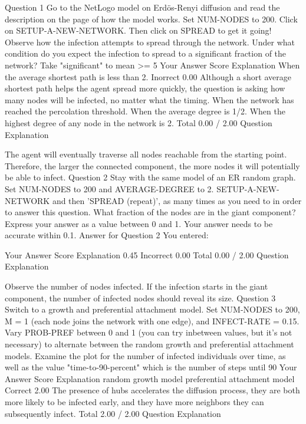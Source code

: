 Question 1
Go to the NetLogo model on Erdös-Renyi diffusion and read the description on the page of how the model works. Set NUM-NODES to 200. Click on SETUP-A-NEW-NETWORK. Then click on SPREAD to get it going! Observe how the infection attempts to spread through the network. Under what condition do you expect the infection to spread to a significant fraction of the network? Take "significant" to mean >= 5%
Your Answer		Score	Explanation
When the average shortest path is less than 2.	Inorrect	0.00	Although a short average shortest path helps the agent spread more quickly, the question is asking how many nodes will be infected, no matter what the timing.
When the network has reached the percolation threshold.			
When the average degree is 1/2.			
When the highest degree of any node in the network is 2.			
Total		0.00 / 2.00	
Question Explanation

The agent will eventually traverse all nodes reachable from the starting point. Therefore, the larger the connected component, the more nodes it will potentially be able to infect.
Question 2
Stay with the same model of an ER random graph. Set NUM-NODES to 200 and AVERAGE-DEGREE to 2. SETUP-A-NEW-NETWORK and then 'SPREAD (repeat)', as many times as you need to in order to answer this question. What fraction of the nodes are in the giant component? Express your answer as a value between 0 and 1. Your answer needs to be accurate within 0.1.
Answer for Question 2
You entered:

Your Answer		Score	Explanation
0.45	Incorrect	0.00	
Total		0.00 / 2.00	
Question Explanation

Observe the number of nodes infected. If the infection starts in the giant component, the number of infected nodes should reveal its size.
Question 3
Switch to a growth and preferential attachment model. Set NUM-NODES to 200, M = 1 (each node joins the network with one edge), and INFECT-RATE = 0.15. Vary PROB-PREF between 0 and 1 (you can try inbetween values, but it's not necessary) to alternate between the random growth and preferential attachment models. Examine the plot for the number of infected individuals over time, as well as the value "time-to-90-percent" which is the number of steps until 90%
Your Answer		Score	Explanation
random growth model			
preferential attachment model	Correct	2.00	The presence of hubs accelerates the diffusion process, they are both more likely to be infected early, and they have more neighbors they can subsequently infect.
Total		2.00 / 2.00	
Question Explanation

